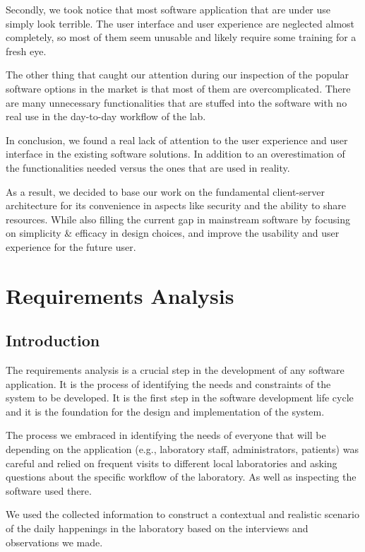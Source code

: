 \documentclass{article}
\begin{document}
Secondly, we took notice that most software application that are under use simply look terrible.
The user interface and user experience are neglected almost completely, so most of them seem unusable and likely require some training for a fresh eye.

The other thing that caught our attention during our inspection of the popular software options in the market is that most of them are overcomplicated. There are many unnecessary functionalities that are stuffed into the software with no real use in the day-to-day workflow of the lab. 

In conclusion, we found a real lack of attention to the user experience and user interface in the existing software solutions. In addition to an overestimation of the functionalities needed versus the ones that are used in reality. 

As a result, we decided to base our work on the fundamental client-server architecture for its convenience in aspects like security and the ability to share resources. While also filling the current gap in mainstream software by focusing on simplicity \& efficacy in design choices, and improve the usability and user experience for the future user.


\section{Requirements Analysis}

\subsection[Introduction]{Introduction}
The requirements analysis is a crucial step in the development of any software application. It is the process of identifying the needs and constraints of the system to be developed. It is the first step in the software development life cycle and it is the foundation for the design and implementation of the system.

The process we embraced in identifying the needs of everyone that will be depending on the application (e.g., laboratory staff, administrators, patients) was careful and relied on frequent visits to different local laboratories and asking questions about the specific workflow of the laboratory. As well as inspecting the software used there.

We used the collected information to construct a contextual and realistic scenario of the daily happenings in the laboratory based on the interviews and observations we made.
\end{document}
